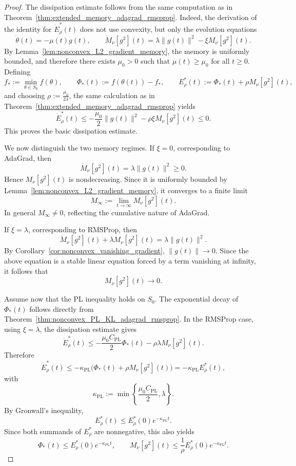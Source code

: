 \documentclass{article} %
\begin{document}
\begin{proof}
The dissipation estimate follows from the same computation as in Theorem~\ref{thm:extended_memory_adagrad_rmsprop}. Indeed, the derivation of the identity for \(\dot E_\rho^*(t)\) does not use convexity, but only the evolution equations
\[
    \dot\theta(t)=-\mu(t)g(t),
    \qquad
    \dot M_\nu[g^2](t)
    =
    \lambda\|g(t)\|^2-\xi M_\nu[g^2](t).
\]
By Lemma~\ref{lem:nonconvex_L2_gradient_memory}, the memory is uniformly bounded, and therefore there exists \(\mu_0>0\) such that $\mu(t)\geq \mu_0$ for all $t\geq0$. Defining
\[
    f_*:=\min_{\theta\in S_0}f(\theta),
    \qquad
    \Phi_*(t):=f(\theta(t))-f_*,
    \qquad
    E_\rho^*(t):=\Phi_*(t)+\rho M_\nu[g^2](t),
\]
and choosing $\rho:=\frac{\mu_0}{2\lambda}$, the same calculation as in Theorem~\ref{thm:extended_memory_adagrad_rmsprop} yields
\[
    \dot E_\rho^*(t)
    \leq
    -
    \frac{\mu_0}{2}\|g(t)\|^2
    -
    \rho\xi M_\nu[g^2](t)
    \leq0.
\]
This proves the basic dissipation estimate.

We now distinguish the two memory regimes. If \(\xi=0\), corresponding to AdaGrad, then
\[
    \dot M_\nu[g^2](t)=\lambda\|g(t)\|^2\geq0.
\]
Hence \(M_\nu[g^2](t)\) is nondecreasing. Since it is uniformly bounded by Lemma~\ref{lem:nonconvex_L2_gradient_memory}, it converges to a finite limit
\[
    M_\infty:=\lim_{t\to\infty}M_\nu[g^2](t).
\]
In general \(M_\infty\neq0\), reflecting the cumulative nature of AdaGrad.

If \(\xi=\lambda\), corresponding to RMSProp, then
\[
    \dot M_\nu[g^2](t)+\lambda M_\nu[g^2](t)
    =
    \lambda\|g(t)\|^2.
\]
By Corollary~\ref{cor:nonconvex_vanishing_gradient}, \(\|g(t)\|\to0\). Since the above equation is a stable linear equation forced by a term vanishing at infinity, it follows that
\[
    M_\nu[g^2](t)\to0.
\]


Assume now that the PL inequality holds on \(S_0\). The exponential decay of \(\Phi_*(t)\) follows directly from Theorem~\ref{thm:nonconvex_PL_KL_adagrad_rmsprop}. In the RMSProp case, using \(\xi=\lambda\), the dissipation estimate gives
\[
    \dot E_\rho^*(t)
    \leq
    -
    \frac{\mu_0 C_{\mathrm{PL}}}{2}\Phi_*(t)
    -
    \rho\lambda M_\nu[g^2](t).
\]
Therefore
\[
    \dot E_\rho^*(t)
    \leq
    -
    \kappa_{\mathrm{PL}}
    \bigl(
        \Phi_*(t)+\rho M_\nu[g^2](t)
    \bigr)
    =
    -
    \kappa_{\mathrm{PL}}E_\rho^*(t),
\]
with
\[
    \kappa_{\mathrm{PL}}
    :=
    \min\left\{
        \frac{\mu_0 C_{\mathrm{PL}}}{2},
        \lambda
    \right\}.
\]
By Gronwall's inequality,
\[
    E_\rho^*(t)
    \leq
    E_\rho^*(0)e^{-\kappa_{\mathrm{PL}}t}.
\]
Since both summands of \(E_\rho^*\) are nonnegative, this also yields
\[
    \Phi_*(t)
    \leq
    E_\rho^*(0)e^{-\kappa_{\mathrm{PL}}t},
    \qquad
    M_\nu[g^2](t)
    \leq
    \frac1\rho E_\rho^*(0)e^{-\kappa_{\mathrm{PL}}t}.
\]


\end{proof}
\end{document}
